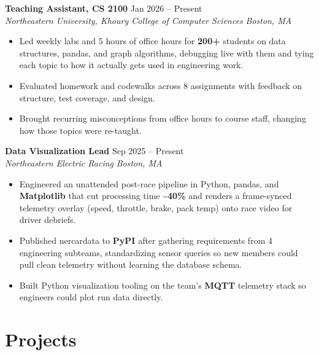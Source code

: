 \documentclass[letterpaper,10pt]{article}
\newcommand{\entrysize}{\fontsize{10.5}{12}\selectfont}
\newif\ifentrygap
\newcommand{\entrygapsize}{6pt}
\newcommand{\entryfirstgap}{0.4pt}
\newcommand{\entrysep}{\ifentrygap\vspace{\entrygapsize}\else\vspace{\entryfirstgap}\fi\global\entrygaptrue}
\let\entryorigsection\section
\renewcommand{\section}{\global\entrygapfalse\entryorigsection}
\newcommand{\entry}[4]{\entrysep{\entrysize\textbf{#1}} \hfill #2 \\ \textit{#3} \hfill \textit{#4}}
\begin{document}
\entry{Teaching Assistant, CS 2100}{Jan 2026 -- Present}
      {Northeastern University, Khoury College of Computer Sciences}{Boston, MA}
\begin{itemize}
  \item Led weekly labs and 5 hours of office hours for \textbf{200+} students on data structures, pandas, and graph algorithms,
        debugging live with them and tying each topic to how it actually gets used in engineering work.
  \item Evaluated homework and codewalks across 8 assignments with feedback on structure, test coverage, and design.
  \item Brought recurring misconceptions from office hours to course staff, changing how those topics were re-taught.
\end{itemize}

\entry{Data Visualization Lead}{Sep 2025 -- Present}
      {Northeastern Electric Racing}{Boston, MA}
\begin{itemize}
  \item Engineered an unattended post-race pipeline in Python, pandas, and \textbf{Matplotlib} that cut processing time
        \textasciitilde\textbf{40\%} and renders a frame-synced telemetry overlay (speed, throttle, brake, pack temp) onto race video for driver debriefs.
  \item Published nercardata to \textbf{PyPI} after gathering requirements from 4 engineering subteams,
        standardizing sensor queries so new members could pull clean telemetry without learning the database schema.
  \item Built Python visualization tooling on the team's \textbf{MQTT} telemetry stack so engineers could plot run data directly.
\end{itemize}

\section{Projects}
\end{document}
